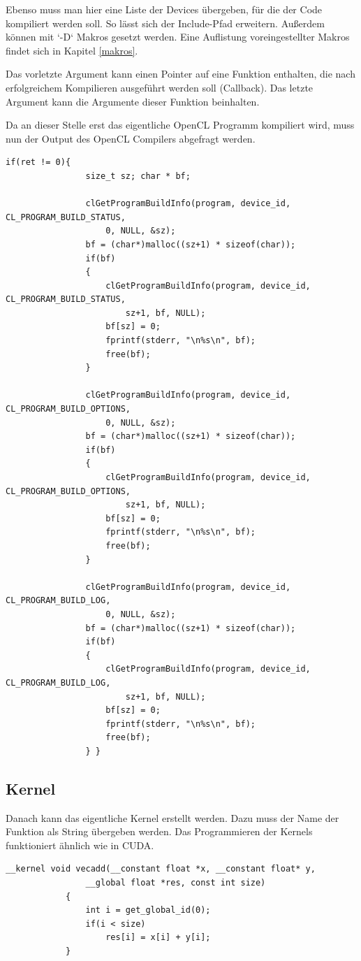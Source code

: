 			Ebenso muss man hier eine Liste der Devices übergeben, für die der Code kompiliert werden soll. So lässt sich der Include-Pfad erweitern. Außerdem können mit \li`-D` Makros gesetzt werden. Eine Auflistung voreingestellter Makros findet sich in Kapitel \ref{makros}.
			
			Das vorletzte Argument kann einen Pointer auf eine Funktion enthalten, die nach erfolgreichem Kompilieren ausgeführt werden soll (Callback). Das letzte Argument kann die Argumente dieser Funktion beinhalten.
			
			Da an dieser Stelle erst das eigentliche OpenCL Programm kompiliert wird, muss nun der Output des OpenCL Compilers abgefragt werden.
					
			\begin{lstlisting}[caption=Fehlerabfrage OpenCL Compiler]
			if(ret != 0){
				size_t sz; char * bf;

				clGetProgramBuildInfo(program, device_id, CL_PROGRAM_BUILD_STATUS, 
					0, NULL, &sz);
				bf = (char*)malloc((sz+1) * sizeof(char));
				if(bf)
				{
					clGetProgramBuildInfo(program, device_id, CL_PROGRAM_BUILD_STATUS, 
						sz+1, bf, NULL);
					bf[sz] = 0;
					fprintf(stderr, "\n%s\n", bf);
					free(bf);
				}

				clGetProgramBuildInfo(program, device_id, CL_PROGRAM_BUILD_OPTIONS, 
					0, NULL, &sz);
				bf = (char*)malloc((sz+1) * sizeof(char));
				if(bf)
				{
					clGetProgramBuildInfo(program, device_id, CL_PROGRAM_BUILD_OPTIONS, 
						sz+1, bf, NULL);
					bf[sz] = 0;
					fprintf(stderr, "\n%s\n", bf);
					free(bf);
				}
				
				clGetProgramBuildInfo(program, device_id, CL_PROGRAM_BUILD_LOG, 
					0, NULL, &sz);
				bf = (char*)malloc((sz+1) * sizeof(char));
				if(bf)
				{
					clGetProgramBuildInfo(program, device_id, CL_PROGRAM_BUILD_LOG, 
						sz+1, bf, NULL);
					bf[sz] = 0;
					fprintf(stderr, "\n%s\n", bf);
					free(bf);
				} }
			\end{lstlisting}
			
			\newpage
			
			\subsection{Kernel}
			Danach kann das eigentliche \Gls{Kernel} erstellt werden. Dazu muss der Name der Funktion als String übergeben werden. Das Programmieren der Kernels funktioniert ähnlich wie in CUDA.			
            \begin{lstlisting}[caption=Kerneldefinition]
            __kernel void vecadd(__constant float *x, __constant float* y, 
                __global float *res, const int size)
            {
                int i = get_global_id(0);
                if(i < size)
                    res[i] = x[i] + y[i];
            }
            \end{lstlisting}
			
